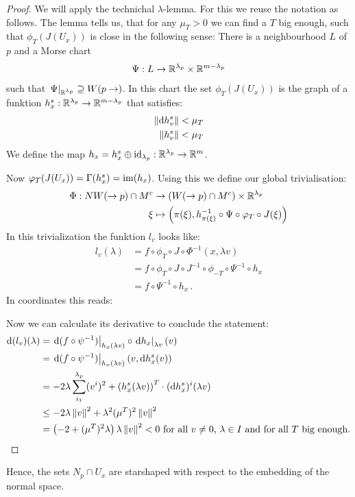 \begin{proof}
	We will apply the technichal $\lambda$-lemma. For this we reuse the notation as follows. The lemma tells us, that for any $\mu_T>0$ we can find a $T$ big enough, such that $\phi_T(J(U_x))$ is close in the following sense: There is a neighbourhood $L$ of $p$ and a Morse chart 
	\begin{align*}
		\Psi: L\to \mathbb{R}^{\lambda_p}\times \mathbb{R}^{m-\lambda_p}
	\end{align*} such that $\left.\Psi\right|_{\mathbb{R}^{\lambda_p}}\supseteq W(p\to)$. In this chart the set $\phi_T(J(U_x))$ is the graph of a funktion $h^s_x:\mathbb{R}^{\lambda_p}\to \mathbb{R}^{m-\lambda_p}$ that satisfies:
	\begin{align*}
		\left\lVert\mathop{}\!\mathrm{d} h^s_v\right\rVert<\mu_T\\ 
		\left\lVert h^s_v\right\rVert<\mu_T
	\end{align*}
	We define the map $h_x=h^s_x\oplus \operatorname{\mathrm{id}}_{\lambda_p}: \mathbb{R}^{\lambda_p}\to \mathbb{R}^m$.
	
	
	
	
	
	Now $\varphi_T(J(U_x))=\Gamma(h^s_x)=\mathrm{im} (h_x)$. Using this we define our global trivialisation:
	\begin{align*}
		\Phi: NW(\to p)\cap M^c &\to  \left(W(\to p)\cap M^c\right)\times \mathbb{R}^{\lambda_p}\\
		\xi &\mapsto \left(\pi(\xi), h^{-1}_{\pi(\xi)}\circ \Psi \circ \varphi_T \circ J(\xi)\right)
	\end{align*}
	In this trivialization the funktion $l_v$ looks like:
	\begin{align*}
		l_v(\lambda)
		&=f \circ \phi_T\circ J \circ \Phi^{-1} (x,\lambda v)\\
		&=f \circ \phi_T\circ J\circ J^{-1}\circ \phi_{-T}\circ \Psi^{-1} \circ h_x\\
		&=f \circ \Psi^{-1} \circ h_x\, .
	\end{align*} 
	In coordinates this reads:
	
	
	
	Now we can calculate its derivative to conclude the statement: 
	\begin{align*}
		\mathop{}\!\mathrm{d} (l_v)(\lambda)
		&=\left.\mathop{}\!\mathrm{d} (f\circ \psi^{-1})\right|_{h_x(\lambda v)}\circ \left.\mathop{}\!\mathrm{d} h_x\right|_{\lambda v} (v)\\
		&=\left.\mathop{}\!\mathrm{d} (f\circ \psi^{-1})\right|_{h_x(\lambda v)} (v,\mathop{}\!\mathrm{d} h_x^s(v))\\
		&=-2\lambda \sum_{i_1}^{\lambda_p}(v^i)^2+\left(h^s_x(\lambda v)\right)^T\cdot (\mathop{}\!\mathrm{d} h_x^s)^i(\lambda v)\\
		&\leq-2\lambda \left\lVert v\right\rVert^2 +\lambda^2 (\mu^T )^2\left\lVert v\right\rVert^2\\
		&= \left( -2+(\mu^T)^2\lambda \right) \lambda \left\lVert v\right\rVert^2<0 \text{ for all $v\neq 0$, $\lambda \in I$ and for all $T$ big enough.}
	\end{align*}		
\end{proof}
Hence, the sets $N_p\cap U_x$ are starshaped with respect to the embedding of the normal space.

